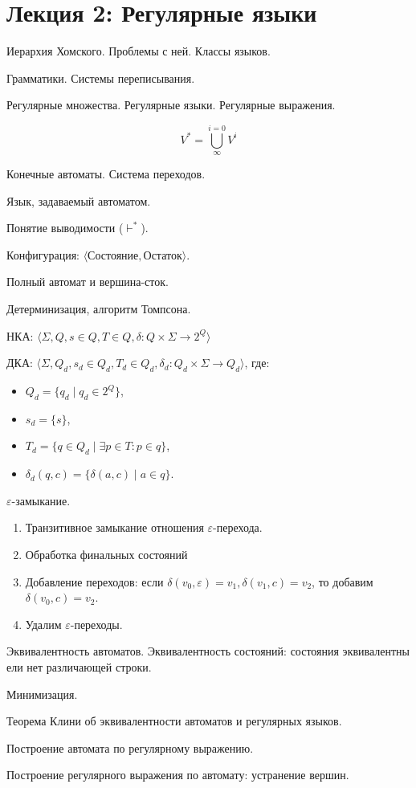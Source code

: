 \section{Лекция 2: Регулярные языки}

Иерархия Хомского. Проблемы с ней. Классы языков.

Грамматики. Системы переписывания.

Регулярные множества. Регулярные языки. Регулярные выражения.

$$
V^* = \bigcup\limits^{i=0}_{\infty} V^i
$$

Конечные автоматы. Система переходов.

Язык, задаваемый автоматом.

Понятие выводимости ($\vdash^*$).

Конфигурация: $\langle \text{Состояние}, \text{Остаток} \rangle$.

Полный автомат и вершина-сток.

Детерминизация, алгоритм Томпсона.

НКА: $\langle \Sigma, Q, s \in Q, T \in Q, \delta: Q \times \Sigma \to 2^Q \rangle$

ДКА: $\langle \Sigma, Q_d, s_d \in Q_d,T_d \in Q_d, \delta_d:Q_d \times \Sigma \to Q_d\rangle$, где:

\begin{itemize}
\item $Q_d=\{q_d \mid q_d \in 2^Q\}$,
\item $s_d=\{s\}$,
\item $T_d=\{q \in Q_d \mid \exists p \in T : p \in q\}$,
\item $\delta_d(q,c)=\{\delta(a,c) \mid a \in q\}$.
\end{itemize}


$\varepsilon$-замыкание.
\begin{enumerate}
\item Транзитивное замыкание отношения $\varepsilon$-перехода.
\item Обработка финальных состояний
\item Добавление переходов: если $\delta(v_0,\varepsilon) = v_1, \delta(v_1,c) = v_2$, то добавим $\delta(v_0,c) = v_2$.
\item Удалим $\varepsilon$-переходы.
\end{enumerate}

Эквивалентность автоматов. Эквивалентность состояний: состояния эквивалентны ели нет различающей строки.

Минимизация.


Теорема Клини об эквивалентности автоматов и регулярных языков.

Построение автомата по регулярному выражению.

Построение регулярного выражения по автомату: устранение вершин.
